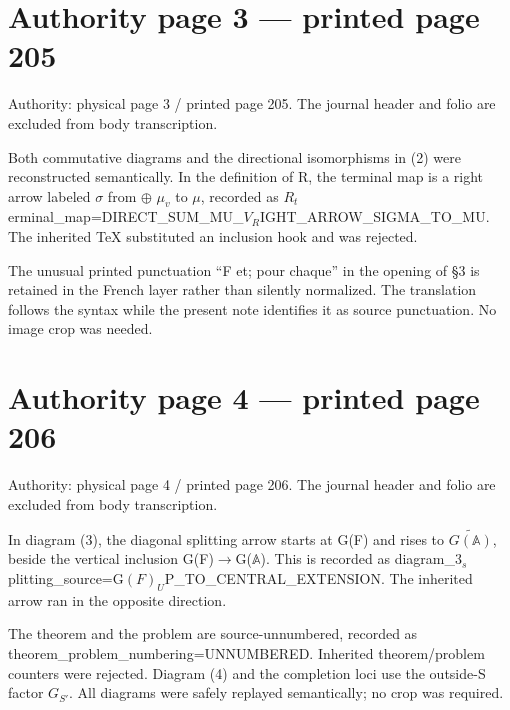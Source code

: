 \documentclass[10pt,a4paper]{article}
\begin{document}
\section*{Authority page 3 --- printed page 205}
\noindent Authority: physical page 3 / printed page 205. The journal header and folio are excluded from body transcription.\par
\smallskip
\noindent Both commutative diagrams and the directional isomorphisms in (2) were reconstructed semantically. In the definition of R, the terminal map is a right arrow labeled \ensuremath{σ} from \ensuremath{⊕} \ensuremath{μ_v} to \ensuremath{μ}, recorded as \ensuremath{R_t}erminal\allowbreak\_map=DIRECT\allowbreak\_SUM\allowbreak\_MU\allowbreak\_\ensuremath{V_R}IGHT\allowbreak\_ARROW\allowbreak\_SIGMA\allowbreak\_TO\allowbreak\_MU. The inherited TeX substituted an inclusion hook and was rejected.\par
\smallskip
\noindent The unusual printed punctuation “F et; pour chaque” in the opening of §3 is retained in the French layer rather than silently normalized. The translation follows the syntax while the present note identifies it as source punctuation. No image crop was needed.\par
\clearpage
{}\hypertarget{authority-page-0004}{}
\section*{Authority page 4 --- printed page 206}
\noindent Authority: physical page 4 / printed page 206. The journal header and folio are excluded from body transcription.\par
\smallskip
\noindent In diagram (3), the diagonal splitting arrow starts at G(F) and rises to \ensuremath{\widetilde{G(𝔸)}}, beside the vertical inclusion G(F)\ensuremath{→}G(\ensuremath{𝔸}). This is recorded as diagram\allowbreak\_\ensuremath{3_s}plitting\allowbreak\_source=G\ensuremath{(F)_U}P\allowbreak\_TO\allowbreak\_CENTRAL\allowbreak\_EXTENSION. The inherited arrow ran in the opposite direction.\par
\smallskip
\noindent The theorem and the problem are source-unnumbered, recorded as theorem\allowbreak\_problem\allowbreak\_numbering=UNNUMBERED. Inherited theorem/problem counters were rejected. Diagram (4) and the completion loci use the outside-S factor \ensuremath{G_{S′}}. All diagrams were safely replayed semantically; no crop was required.\par
\clearpage
{}\hypertarget{authority-page-0005}{}
\end{document}

